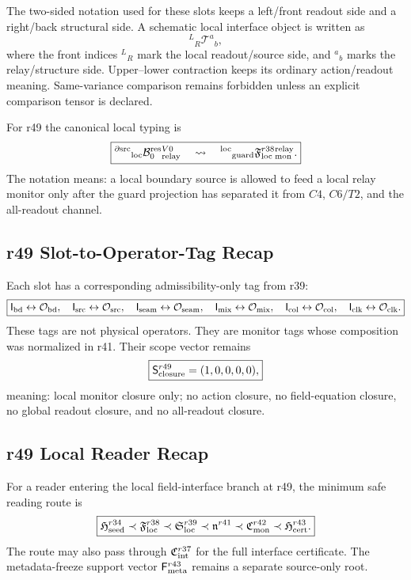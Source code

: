 The two-sided notation used for these slots keeps a left/front readout side and a
right/back structural side.  A schematic local interface object is written as
\[
\boxed{
{}^{L}{}_{R}\mathcal T^{a}{}_{b},
}
\]
where the front indices \({}^{L}{}_{R}\) mark the local readout/source side, and
\({}^{a}{}_{b}\) marks the relay/structure side.  Upper--lower contraction keeps
its ordinary action/readout meaning.  Same-variance comparison remains forbidden
unless an explicit comparison tensor is declared.

For r49 the canonical local typing is
\[
\boxed{
{}^{\partial{\rm src}}{}_{\rm loc}
\mathcal B_0^{\rm res}
{}^{V0}_{\rm relay}
\quad\leadsto\quad
{}^{\rm loc}{}_{\rm guard}
\mathfrak F_{\rm loc}^{r38}
{}^{\rm relay}_{\rm mon}.
}
\]
The notation means: a local boundary source is allowed to feed a local relay
monitor only after the guard projection has separated it from \(C4\), \(C6/T2\),
and the all-readout channel.

\subsection{r49 Slot-to-Operator-Tag Recap}
\label{subsec:r49-slot-to-operator-tag-recap}

Each slot has a corresponding admissibility-only tag from r39:
\[
\boxed{
\mathsf I_{\rm bd}\leftrightarrow\mathcal O_{\rm bd},\quad
\mathsf I_{\rm src}\leftrightarrow\mathcal O_{\rm src},\quad
\mathsf I_{\rm seam}\leftrightarrow\mathcal O_{\rm seam},\quad
\mathsf I_{\rm mix}\leftrightarrow\mathcal O_{\rm mix},\quad
\mathsf I_{\rm col}\leftrightarrow\mathcal O_{\rm col},\quad
\mathsf I_{\rm clk}\leftrightarrow\mathcal O_{\rm clk}.
}
\]
These tags are not physical operators.  They are monitor tags whose composition
was normalized in r41.  Their scope vector remains
\[
\boxed{
\mathsf S_{\rm closure}^{r49}=(1,0,0,0,0),
}
\]
meaning: local monitor closure only; no action closure, no field-equation
closure, no global readout closure, and no all-readout closure.

\subsection{r49 Local Reader Recap}
\label{subsec:r49-local-reader-recap}

For a reader entering the local field-interface branch at r49, the minimum safe
reading route is
\[
\boxed{
\mathfrak H_{\rm seed}^{r34}
\prec
\mathfrak F_{\rm loc}^{r38}
\prec
\mathfrak S_{\rm loc}^{r39}
\prec
\mathfrak n^{r41}
\prec
\mathfrak C_{\rm mon}^{r42}
\prec
\mathfrak H_{\rm cert}^{r43}.
}
\]
The route may also pass through \(\mathfrak C_{\rm int}^{r37}\) for the full
interface certificate.  The metadata-freeze support vector \(\mathsf F_{\rm
meta}^{r43}\) remains a separate source-only root.

